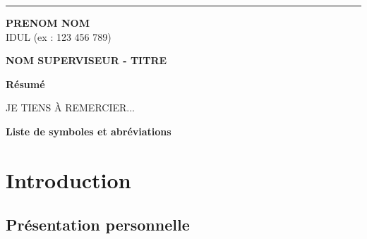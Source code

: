 \documentclass[12pt]{article} 	%
\begin{document}
\par\noindent\rule{\textwidth}{0.4pt}
\begin{minipage}[t]{6cm}
	\begin{flushleft}
		\textbf {PRENOM NOM}\\
		IDUL (ex : 123 456 789)
	\end{flushleft}
\end{minipage}
		\begin{minipage}[t]{10cm}
				\begin{flushright}		
						\hspace*{1cm}\textbf {NOM SUPERVISEUR - TITRE} \\
				\end{flushright}		
		\end{minipage}

\newpage
{}
\textbf{Résumé}  %


\newpage
\vspace*{\fill}
	\begin{center}	
		JE TIENS À REMERCIER...
	\end{center}	
\vspace*{\fill}


\newpage
\tableofcontents


\newpage
\listoftables


\newpage
\listoffigures


\newpage
\textbf{Liste de symboles et abréviations}\\
\break


\newpage
{}

\section{Introduction}  %

\subsection{Présentation personnelle}
\end{document}
